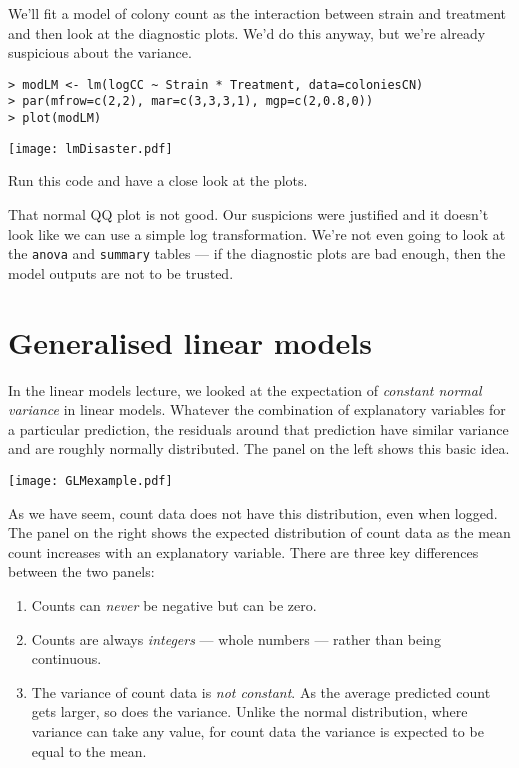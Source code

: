 We'll fit a model of colony count as the interaction between strain and 
treatment and then look at the diagnostic plots. We'd do this anyway, 
but we're already suspicious about the variance.

\begin{lstlisting}
> modLM <- lm(logCC ~ Strain * Treatment, data=coloniesCN)
> par(mfrow=c(2,2), mar=c(3,3,3,1), mgp=c(2,0.8,0))
> plot(modLM)
\end{lstlisting}

\begin{center}
	\texttt{[image: lmDisaster.pdf]} 	
\end{center}

\begin{compactitem}[$\quad\star$]
	\item Run this code and have a close look at the plots. 
\end{compactitem}

That normal QQ plot is not good. Our suspicions were justified and it 
doesn't look like we can use a simple log transformation. We're not 
even going to look at the {\tt anova} and {\tt summary} tables --- if 
the diagnostic plots are bad enough, then the model outputs are not to 
be trusted.

\section{Generalised linear models}

In the linear models lecture, we looked at the expectation of {\it 
constant normal variance} in linear models. Whatever the combination of 
explanatory variables for a particular prediction, the residuals around 
that prediction have similar variance and are roughly normally 
distributed. The panel on the left shows this basic idea.

\begin{center}
	\texttt{[image: GLMexample.pdf]} 
\end{center}

As we have seem, count data does not have this distribution, even when 
logged. The panel on the right shows the expected distribution of count 
data as the mean count increases with an explanatory  variable.  There 
are three key differences between the two panels:

\begin{enumerate}
	\item Counts can {\it never} be negative but can be zero.
	\item Counts are always {\it integers} --- whole numbers --- rather 
	than being continuous.
	\item The variance of count data is {\it not constant}. As the 
	average predicted count gets larger, so does the variance. Unlike the 
	normal distribution, where variance can take any value, for count 
	data  the variance is expected to be equal to the mean.
\end{enumerate}

